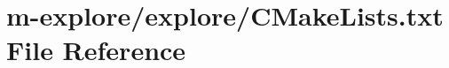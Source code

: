 \hypertarget{m-explore_2explore_2CMakeLists_8txt}{}\section{m-\/explore/explore/\+C\+Make\+Lists.txt File Reference}
\label{m-explore_2explore_2CMakeLists_8txt}
